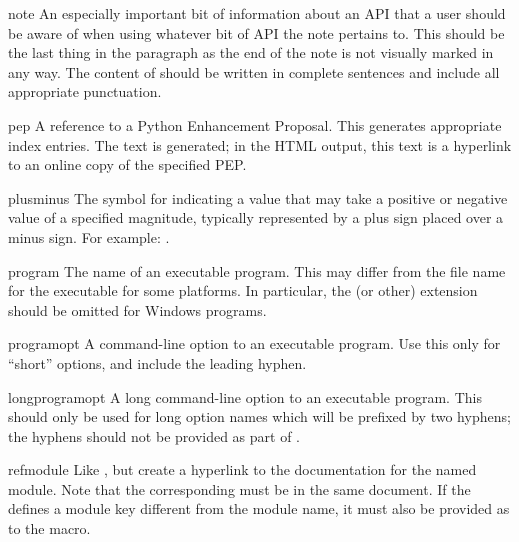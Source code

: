 \documentclass{howto}
\begin{document}
    \begin{macrodesc}{note}{}
      An especially important bit of information about an API that a
      user should be aware of when using whatever bit of API the
      note pertains to.  This should be the last thing in the
      paragraph as the end of the note is not visually marked in
      any way.  The content of  should be written in
      complete sentences and include all appropriate punctuation.
    \end{macrodesc}

    \begin{macrodesc}{pep}{}
      A reference to a Python Enhancement Proposal.  This generates
      appropriate index entries.  The text  is
      generated; in the HTML output, this text is a hyperlink to an
      online copy of the specified PEP.
    \end{macrodesc}

    \begin{macrodesc}{plusminus}{}
      The symbol for indicating a value that may take a positive or
      negative value of a specified magnitude, typically represented
      by a plus sign placed over a minus sign.  For example:
      .
    \end{macrodesc}

    \begin{macrodesc}{program}{}
      The name of an executable program.  This may differ from the
      file name for the executable for some platforms.  In particular,
      the  (or other) extension should be omitted for
      Windows programs.
    \end{macrodesc}

    \begin{macrodesc}{programopt}{}
      A command-line option to an executable program.  Use this only
      for ``short'' options, and include the leading hyphen.
    \end{macrodesc}

    \begin{macrodesc}{longprogramopt}{}
      A long command-line option to an executable program.  This
      should only be used for long option names which will be prefixed
      by two hyphens; the hyphens should not be provided as part of
      .
    \end{macrodesc}

    \begin{macrodesc}{refmodule}{}
      Like , but create a hyperlink to the documentation
      for the named module.  Note that the corresponding
       must be in the same document.  If the
       defines a module key different from the
      module name, it must also be provided as  to the
       macro.
    \end{macrodesc}
\end{document}
